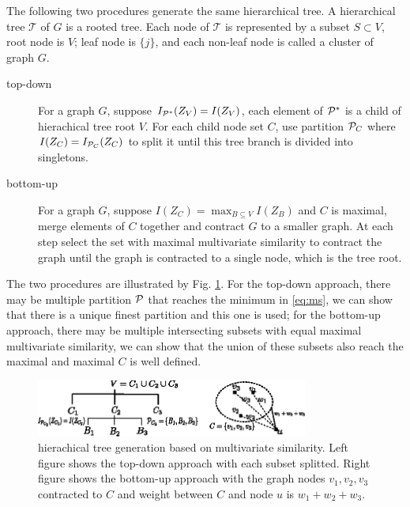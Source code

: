 \documentclass{article}
\begin{document}
\begin{theorem}\label{thm:ta}
The following two procedures generate the same hierarchical tree. A hierarchical tree $\mathcal{T}$ of $G$ is a rooted tree. Each node of $\mathcal{T}$ is represented by a subset $S \subset V$,  root node is $V$; leaf node is $\{j\}$, and each non-leaf node is called a cluster of graph $G$.
\begin{description}
\item[top-down] For a graph $G$, suppose $I_{\P^*}(Z_V)=I(Z_V)$, each element of $\P^*$ is a child of hierachical tree root $V$. For each child node set $C$, use partition $\P_C$ where $I(Z_C)=I_{\P_C}(Z_C)$ to split it until this tree branch is divided into singletons.
\item[bottom-up] For a graph $G$, suppose $I(Z_C) = \max_{B\subseteq V} I(Z_B)$ and $C$ is maximal, merge elements of $C$ together and contract $G$ to a smaller graph. At each step select the set with maximal multivariate similarity to contract the graph until the graph is contracted to a single node, which is the tree root.
\end{description}
\end{theorem}
The two procedures are illustrated by Fig. \ref{fig:ta}. For the top-down approach, there may be multiple partition $\P$ that reaches the minimum in \eqref{eq:ms}, we can show that there is a unique finest partition and this one is used; for the bottom-up approach, there may be multiple intersecting subsets with equal maximal multivariate similarity, we can show that the union of these subsets also reach the maximal and maximal $C$ is well defined.
\begin{figure}
\centering
\includegraphics[width=0.8\textwidth]{pic/two_approach.eps}
\caption{hierachical tree generation based on multivariate similarity. Left figure shows the top-down approach with each subset splitted. Right figure shows the bottom-up approach with the graph nodes $v_1,v_2,v_3$ contracted to $C$ and weight between $C$ and node $u$ is $w_1+w_2+w_3$.}\label{fig:ta}
\end{figure}
\end{document}
